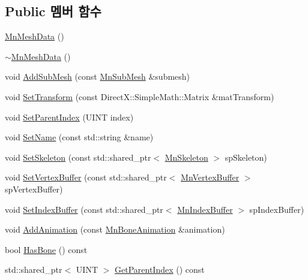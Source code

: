 \subsection*{Public 멤버 함수}
\begin{DoxyCompactItemize}
\item 
\hyperlink{class_m_n_l_1_1_mn_mesh_data_a6012a2d40228be1313a3188b7a1eefcd}{Mn\+Mesh\+Data} ()
\item 
\hyperlink{class_m_n_l_1_1_mn_mesh_data_af1e38c31aa38a1ea459fd68d4be71df7}{$\sim$\+Mn\+Mesh\+Data} ()
\item 
void \hyperlink{class_m_n_l_1_1_mn_mesh_data_acf035cf1ba291fbdd25cf38b856acfc5}{Add\+Sub\+Mesh} (const \hyperlink{struct_m_n_l_1_1_mn_sub_mesh}{Mn\+Sub\+Mesh} \&submesh)
\item 
void \hyperlink{class_m_n_l_1_1_mn_mesh_data_a695340ddfdbf11ba947928702cab7d78}{Set\+Transform} (const Direct\+X\+::\+Simple\+Math\+::\+Matrix \&mat\+Transform)
\item 
void \hyperlink{class_m_n_l_1_1_mn_mesh_data_a4821520088a4e98315269357366c7044}{Set\+Parent\+Index} (U\+I\+NT index)
\item 
void \hyperlink{class_m_n_l_1_1_mn_mesh_data_a75df436523daf783061f4d3752215897}{Set\+Name} (const std\+::string \&name)
\item 
void \hyperlink{class_m_n_l_1_1_mn_mesh_data_a6de0a715ac6d275ebfee31ef6d7e2542}{Set\+Skeleton} (const std\+::shared\+\_\+ptr$<$ \hyperlink{class_m_n_l_1_1_mn_skeleton}{Mn\+Skeleton} $>$ sp\+Skeleton)
\item 
void \hyperlink{class_m_n_l_1_1_mn_mesh_data_a63af26d409c49e637f296419eb60edb4}{Set\+Vertex\+Buffer} (const std\+::shared\+\_\+ptr$<$ \hyperlink{class_m_n_l_1_1_mn_vertex_buffer}{Mn\+Vertex\+Buffer} $>$ sp\+Vertex\+Buffer)
\item 
void \hyperlink{class_m_n_l_1_1_mn_mesh_data_a44e5cc149d2000c081fce11f3a85d1d6}{Set\+Index\+Buffer} (const std\+::shared\+\_\+ptr$<$ \hyperlink{class_m_n_l_1_1_mn_index_buffer}{Mn\+Index\+Buffer} $>$ sp\+Index\+Buffer)
\item 
void \hyperlink{class_m_n_l_1_1_mn_mesh_data_a484dd836ddd1ab819c72a05a6febe554}{Add\+Animation} (const \hyperlink{class_m_n_l_1_1_mn_bone_animation}{Mn\+Bone\+Animation} \&animation)
\item 
bool \hyperlink{class_m_n_l_1_1_mn_mesh_data_a506c6520b99a9e0eba9cf4b2156c275c}{Has\+Bone} () const
\item 
std\+::shared\+\_\+ptr$<$ U\+I\+NT $>$ \hyperlink{class_m_n_l_1_1_mn_mesh_data_a7d8e1da3cec285f2b71c957ab83f1949}{Get\+Parent\+Index} () const

\end{DoxyCompactItemize}

